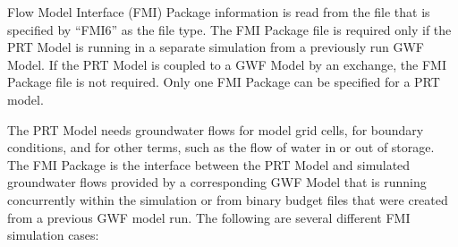 Flow Model Interface (FMI) Package information is read from the file that is specified by ``FMI6'' as the file type.  The FMI Package file is required only if the PRT Model is running in a separate simulation from a previously run GWF Model. If the PRT Model is coupled to a GWF Model by an exchange, the FMI Package file is not required. Only one FMI Package can be specified for a PRT model.

The PRT Model needs groundwater flows for model grid cells, for boundary conditions, and for other terms, such as the flow of water in or out of storage.  The FMI Package is the interface between the PRT Model and simulated groundwater flows provided by a corresponding GWF Model that is running concurrently within the simulation or from binary budget files that were created from a previous GWF model run.  The following are several different FMI simulation cases:

